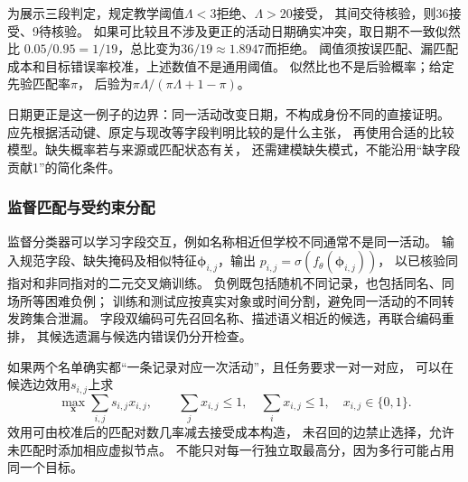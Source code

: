 为展示三段判定，规定教学阈值$\Lambda<3$拒绝、$\Lambda>20$接受，
其间交待核验，则36接受、9待核验。
如果可比较且不涉及更正的活动日期确实冲突，取日期不一致似然比
$0.05/0.95=1/19$，总比变为$36/19\approx1.8947$而拒绝。
阈值须按误匹配、漏匹配成本和目标错误率校准，上述数值不是通用阈值。
似然比也不是后验概率；给定先验匹配率$\pi$，
后验为$\pi\Lambda/(\pi\Lambda+1-\pi)$。

日期更正是这一例子的边界：同一活动改变日期，不构成身份不同的直接证明。
应先根据活动键、原定与现改等字段判明比较的是什么主张，
再使用合适的比较模型。缺失概率若与来源或匹配状态有关，
还需建模缺失模式，不能沿用“缺字段贡献1”的简化条件。

\subsubsection{监督匹配与受约束分配}
\label{sec:nlp-extraction-supervised-matching}

监督分类器可以学习字段交互，例如名称相近但学校不同通常不是同一活动。
输入规范字段、缺失掩码及相似特征$\bm{\phi}_{i,j}$，输出
$p_{i,j}=\sigma(f_\theta(\bm{\phi}_{i,j}))$，
以已核验同指对和非同指对的二元交叉熵训练。
负例既包括随机不同记录，也包括同名、同场所等困难负例；
训练和测试应按真实对象或时间分割，避免同一活动的不同转发跨集合泄漏。
字段双编码可先召回名称、描述语义相近的候选，再联合编码重排，
其候选遗漏与候选内错误仍分开检查。

如果两个名单确实都“一条记录对应一次活动”，且任务要求一对一对应，
可以在候选边效用$s_{i,j}$上求
\begin{equation}
  \max_{\bm{x}}\sum_{i,j}s_{i,j}x_{i,j},
  \qquad
  \sum_jx_{i,j}\leq1,\quad
  \sum_ix_{i,j}\leq1,\quad
  x_{i,j}\in\{0,1\}.
  \label{eq:nlp-extraction-assignment}
\end{equation}
效用可由校准后的匹配对数几率减去接受成本构造，
未召回的边禁止选择，允许未匹配时添加相应虚拟节点。
不能只对每一行独立取最高分，因为多行可能占用同一个目标。

